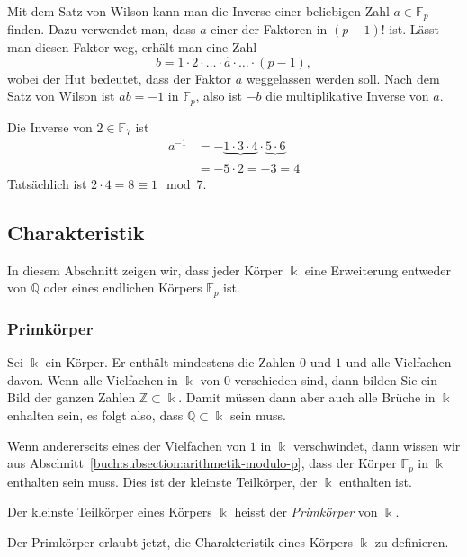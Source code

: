 Mit dem Satz von Wilson kann man die Inverse einer beliebigen Zahl
$a\in\mathbb{F}_p$ finden.
Dazu verwendet man, dass $a$ einer der Faktoren in $(p-1)!$ ist.
Lässt man diesen Faktor weg, erhält man eine Zahl
\[
b = 1\cdot 2 \cdot \ldots\cdot \hat{a}\cdot\ldots\cdot (p-1),
\]
wobei der Hut bedeutet, dass der Faktor $a$ weggelassen werden soll.
Nach dem Satz von Wilson ist $ab=-1$ in $\mathbb{F}_p$, also ist
$-b$ die multiplikative Inverse  von $a$.

\begin{beispiel}
Die Inverse von $2\in\mathbb{F}_7$ ist
\begin{align*}
a^{-1}
&=
-\underbrace{1\cdot 3\cdot 4}_{}\cdot \underbrace{5\cdot 6}_{}
\\
&=
-5\cdot 2
=
-3
=4
\end{align*}
Tatsächlich ist $2\cdot 4=8\equiv 1\mod 7$.
\end{beispiel}

%
%
\subsection{Charakteristik
\label{buch:subsection:charakteristik}}
In diesem Abschnitt zeigen wir, dass jeder Körper $\Bbbk$ eine Erweiterung
entweder von $\mathbb{Q}$ oder eines endlichen Körpers $\mathbb{F}_p$ ist.

\subsubsection{Primkörper}
Sei $\Bbbk$ ein Körper.
Er enthält mindestens die Zahlen $0$ und $1$ und alle Vielfachen davon.
Wenn alle Vielfachen in $\Bbbk$ von $0$ verschieden sind, dann
bilden Sie ein Bild der ganzen Zahlen $\mathbb{Z}\subset\Bbbk$.
Damit müssen dann aber auch alle Brüche in $\Bbbk$ enhalten sein,
es folgt also, dass $\mathbb{Q}\subset\Bbbk$ sein muss.

Wenn andererseits eines der Vielfachen von $1$ in $\Bbbk$ 
verschwindet, dann wissen wir aus
Abschnitt~\ref{buch:subsection:arithmetik-modulo-p}, dass
der Körper $\mathbb{F}_p$ in $\Bbbk$ enthalten sein muss.
Dies ist der kleinste Teilkörper, der $\Bbbk$ enthalten ist.

\begin{definition}
Der kleinste Teilkörper eines Körpers $\Bbbk$ heisst der 
{\em Primkörper} von $\Bbbk$.
\end{definition}

Der Primkörper erlaubt jetzt, die Charakteristik eines Körpers $\Bbbk$
zu definieren.

